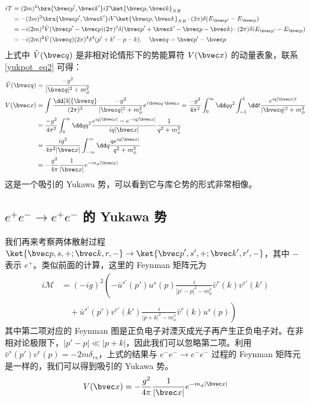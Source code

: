 \begin{equation}
\begin{aligned} 
i\mathcal{T}&=(2m)^2\bra{{\bvec p}',{\bvec k}'}iT\ket{{\bvec p},{\bvec k}}_{NR}\\
& =-(2m)^2\bra{{\bvec p}',{\bvec k}'}iV\ket{{\bvec p},{\bvec k}}_{NR} \cdot (2\pi) \delta(E_{{\bvec p}'}-E_{\bvec p})
\\
& = -i(2m)^2 \tilde{V}({\bvec p}'-{\bvec p})(2\pi)^3 \delta({\bvec p}'+{\bvec k}'-{\bvec p}-{\bvec k})\cdot (2\pi) \delta(E_{{\bvec p}'}-E_{\bvec p})\\
&=-i(2m)^2 \tilde{V}(\bvec q) (2\pi)^4 \delta^4(p'+k'-p-k),\quad \bvec q={\bvec p}'-{\bvec p}
\end{aligned}
\end{equation}
上式中 $\tilde V(\bvec q)$ 是非相对论情形下的势能算符 $V(\bvec x)$ 的动量表象，联系\autoref{yukpot_eq2} 可得：
\begin{equation}
\begin{aligned}
\tilde{V}(\bvec q)&=\frac{-g^2}{|\bvec q|^2+m_\phi^2}\\
V({\bvec x})&=\int \frac{\dd[3]{\bvec q}}{(2\pi)^3} \frac{-g^2}{|\bvec q|^2+m_\phi^2}e^{i\bvec q\cdot {\bvec x}} =\frac{-g^2}{4\pi^2}\int_0^\infty \dd q q^2\int_{-1}^1 \dd t \frac{e^{iq|{\bvec x}|t}}{|\bvec q|^2+m_\phi^2}\\
&= \frac{-g^2}{4\pi^2}\int_0^\infty \dd q q^2\frac{e^{iq|{\bvec x}|}-e^{-iq|{\bvec x}|}}{iq|{\bvec x}|} \frac{1}{q^2+m_\phi^2}\\
&=\frac{ig^2}{4\pi^2|{\bvec x}|}\int_{-\infty}^\infty \dd q \frac{qe^{iq|{\bvec x}|}}{q^2+m_\phi^2}\\
&=-\frac{g^2}{4\pi}\frac{1}{|{\bvec x}|} e^{-m_\phi |{\bvec x}|}
\end{aligned}
\end{equation}
这是一个吸引的 Yukawa 势，可以看到它与库仑势的形式非常相像。
\subsection{$e^+e^-\rightarrow e^+e^-$ 的 Yukawa 势}
我们再来考察两体散射过程 $\ket{{\bvec p},s,+;{\bvec k},r,-}\rightarrow \ket{{\bvec p}',s',+;{\bvec k}',r',-}$，其中 $-$ 表示 $e^+$。类似前面的计算，这里的 Feynman 矩阵元为
\begin{equation}
\begin{aligned}
i\mathcal{M}&=(-ig)^2 \left(
-\bar u^{s'}(p')u^s(p) \frac{i}{|p'-p|^2-m_\phi^2} \bar v^{r}(k) v^{r'}(k')\right.\\
&\left.\quad + \bar u^{s'}(p')v^{r'}(k') \frac{i}{|p+k|^2-m_\phi^2} \bar v^{r}(k) u^s(p)\right)
\end{aligned}
\end{equation}
其中第二项对应的 Feynman 图是正负电子对湮灭成光子再产生正负电子对。在非相对论极限下，$|p'-p|\ll |p+k|$，因此我们可以忽略第二项。利用 $\bar v^s(p') v^r(p)=-2m \delta_{rs}$，上式的结果与 $e^-e^-\rightarrow e^- e^-$ 过程的 Feynman 矩阵元是一样的，我们可以得到吸引的 Yukawa 势。
\[
V({\bvec x})=-\frac{g^2}{4\pi}\frac{1}{|{\bvec x}|} e^{-m_\phi |{\bvec x}|}
\]